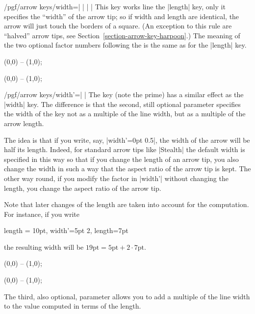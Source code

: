 \begin{key}{/pgf/arrow keys/width=| |%
        | |}
    This key works line the |length| key, only it specifies the ``width'' of
    the arrow tip; so if width and length are identical, the arrow will just
    touch the borders of a square. (An exception to this rule are ``halved''
    arrow tips, see Section~\ref{section-arrow-key-harpoon}.) The meaning of
    the two optional factor numbers following the  is the same
    as for the |length| key.
\begin{codeexample}[preamble={\usetikzlibrary{arrows.meta}}]
\tikz \draw [arrows = {-Latex[width=10pt, length=10pt]}] (0,0) -- (1,0);
\end{codeexample}
\begin{codeexample}[preamble={\usetikzlibrary{arrows.meta}}]
\tikz \draw [arrows = {-Latex[width=0pt 10, length=10pt]}] (0,0) -- (1,0);
\end{codeexample}
\end{key}

\begin{key}{/pgf/arrow keys/width'=| |}
    The key (note the prime) has a similar effect as the |width| key. The
    difference is that the second, still optional parameter  specifies the width of the key not as a multiple of the line width,
    but as a multiple of the arrow length.

    The idea is that if you write, say, |width'=0pt 0.5|, the width of the
    arrow will be half its length. Indeed, for standard arrow tips like
    |Stealth| the default width is specified in this way so that if you change
    the length of an arrow tip, you also change the width in such a way that
    the aspect ratio of the arrow tip is kept. The other way round, if you
    modify the factor in |width'| without changing the length, you change the
    aspect ratio of the arrow tip.

    Note that later changes of the length are taken into account for the
    computation. For instance, if you write
\begin{codeexample}
length = 10pt, width'=5pt 2, length=7pt
\end{codeexample}
    the resulting width will be $19\mathrm{pt} = 5\mathrm{pt} + 2\cdot
    7\mathrm{pt}$.
\begin{codeexample}[preamble={\usetikzlibrary{arrows.meta}}]
\tikz \draw [arrows = {-Latex[width'=0pt .5, length=10pt]}] (0,0) -- (1,0);
\end{codeexample}
\begin{codeexample}[preamble={\usetikzlibrary{arrows.meta}}]
\tikz \draw [arrows = {-Latex[width'=0pt .5, length=15pt]}] (0,0) -- (1,0);
\end{codeexample}
    The third, also optional, parameter allows you to add a multiple of the
    line width to the value computed in terms of the length.
\end{key}


